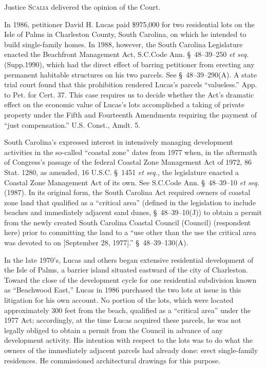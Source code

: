 

\opinion Justice \textsc{Scalia} delivered the opinion of the Court.

In 1986, petitioner David H. Lucas paid \$975,000 for two residential lots on
the Isle of Palms in Charleston County, South Carolina, on which he intended to
build single-family homes. In 1988, however, the South Carolina Legislature
enacted the Beachfront Management Act, S.C.Code Ann. \S~48--39--250 \textit{et
seq.} (Supp.1990), which had the direct effect of barring petitioner from
erecting any permanent habitable structures on his two parcels. See
\S~48--39--290(A). A state trial court found that this prohibition rendered
Lucas's parcels ``valueless.'' App. to Pet. for Cert. 37. This case requires us
to decide whether the Act's dramatic effect on the economic value of Lucas's
lots accomplished a taking of private property under the Fifth and Fourteenth
Amendments requiring the payment of ``just compensation.'' U.S. Const., Amdt. 5.





South Carolina's expressed interest in intensively managing development
activities in the so-called ``coastal zone'' dates from 1977 when, in the
aftermath of Congress's passage of the federal Coastal Zone Management Act of
1972, 86 Stat. 1280, as amended, 16 U.S.C. \S~1451 \textit{et seq.}, the
legislature enacted a Coastal Zone Management Act of its own. See S.C.Code Ann.
\S~48--39--10 \textit{et seq.} (1987). In its original form, the South Carolina
Act required owners of coastal zone land that qualified as a ``critical area''
(defined in the legislation to include beaches and immediately adjacent sand
dunes, \S~48--39--10(J)) to obtain a permit from the newly created South
Carolina Coastal Council (Council) (respondent here) prior to committing the
land to a ``use other than the use the critical area was devoted to on
[September 28, 1977].'' \S~48--39--130(A).

In the late 1970's, Lucas and others began extensive residential development of
the Isle of Palms, a barrier island situated eastward of the city of Charleston.
Toward the close of the development cycle for one residential subdivision known
as ``Beachwood East,'' Lucas in 1986 purchased the two lots at issue in this
litigation for his own account. No portion of the lots, which were located
approximately 300 feet from the beach, qualified as a ``critical area'' under
the 1977 Act; accordingly, at the time Lucas acquired these parcels, he was not
legally obliged to obtain a permit from the Council in advance of any
development activity. His intention with respect to the lots was to do what the
owners of the immediately adjacent parcels had already done: erect single-family
residences. He commissioned architectural drawings for this purpose.

